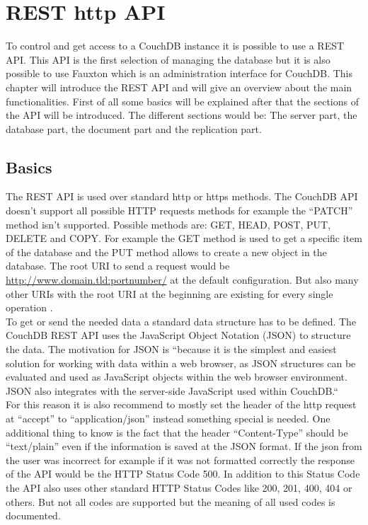 \section{REST http API}


To control and get access to a CouchDB instance it is possible to use a REST API. This API is the first selection of managing the database but it is also possible to use Fauxton which is an administration interface for CouchDB. This chapter will introduce the REST API and will give an overview about the main functionalities. First of all some basics will be explained after that the sections of the API will be introduced. The different sections would be: The server part, the database part, the document part and the replication part.

\subsection{Basics}

The REST API is used over standard http or https methods. The CouchDB API doesn’t support all possible HTTP requests methods for example the “PATCH” method isn’t supported. Possible methods are: GET, HEAD, POST, PUT, DELETE and COPY. For example the GET method is used to get a specific item of the database and the PUT method allows to create a new object in the database. The root URI to send a request would be \url{http://www.domain.tld:portnumber/}  at the default configuration. But also many other URIs with the root URI at the beginning are existing for every single operation \parencite{CouchDBRestRFCPatch, CouchDBRestBasic}. \\
To get or send the needed data a standard data structure has to be defined. The CouchDB REST API uses the JavaScript Object Notation (JSON) to structure the data. The motivation for JSON is “because it is the simplest and easiest solution for working with data within a web browser, as JSON structures can be evaluated and used as JavaScript objects within the web browser environment. JSON also integrates with the server-side JavaScript used within CouchDB.“ \parencite{CouchDBRestJson}  \\
For this reason it is also recommend to mostly set the header of the http request at “accept” to “application/json” instead something special is needed. One additional thing to know is the fact that the header “Content-Type” should be “text/plain” even if the information is saved at the JSON format. If the json from the user was incorrect for example if it was not formatted correctly the response of the API would be the HTTP Status Code 500. In addition to this Status Code the API also uses other standard HTTP Status Codes like 200, 201, 400, 404 or others. But not all codes are supported but the meaning of all used codes is documented\parencite{CouchDBRestBasic}.

